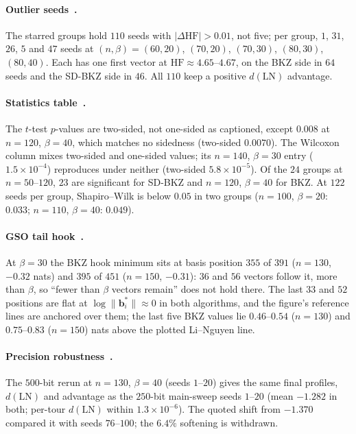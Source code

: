\documentclass[journal=cic,version=preprint]{iacrj}
\begin{document}
\paragraph{Outlier seeds~\cite[\S4.1]{Paper1}.} The starred groups hold $110$ seeds with
$|\Delta\mathrm{HF}|>0.01$, not five; per group, $1$, $31$, $26$, $5$ and
$47$ seeds at $(n,\beta)=(60,20)$, $(70,20)$, $(70,30)$, $(80,30)$, $(80,40)$. Each has one
first vector at $\mathrm{HF}\approx4.65$--$4.67$, on the BKZ side in $64$
seeds and the SD-BKZ side in $46$. All $110$ keep a positive
$d(\mathrm{LN})$ advantage.

\paragraph{Statistics table~\cite[\S4]{Paper1}.} The $t$-test $p$-values are two-sided,
not one-sided as captioned, except $0.008$ at $n=120$, $\beta=40$, which
matches no sidedness (two-sided $0.0070$). The Wilcoxon column mixes two-sided and
one-sided values; its $n=140$, $\beta=30$ entry ($1.5\times10^{-4}$)
reproduces under neither (two-sided $5.8\times10^{-5}$). Of the $24$ groups
at $n=50$--$120$, $23$ are significant for SD-BKZ and $n=120$, $\beta=40$
for BKZ. At $122$ seeds per group, Shapiro--Wilk is below $0.05$ in two groups ($n=100$, $\beta=20$:
$0.033$; $n=110$, $\beta=40$: $0.049$).

\paragraph{GSO tail hook~\cite[\S5.4, \S8.4]{Paper1}.} At $\beta=30$ the BKZ hook
minimum sits at basis position $355$ of $391$ ($n=130$, $-0.32$ nats) and
$395$ of $451$ ($n=150$, $-0.31$): $36$ and $56$ vectors follow it, more
than $\beta$, so ``fewer than $\beta$ vectors remain'' does not hold there.
The last $33$ and $52$ positions are flat at $\log\|\mathbf b_i^\ast\|\approx0$ in
both algorithms, and the figure's reference lines are anchored over them;
the last five BKZ values lie $0.46$--$0.54$ ($n=130$) and $0.75$--$0.83$
($n=150$) nats above the plotted Li--Nguyen line.

\paragraph{Precision robustness~\cite[\S7.4]{Paper1}.} The $500$-bit rerun at $n=130$,
$\beta=40$ (seeds $1$--$20$) gives the same final profiles, $d(\mathrm{LN})$ and advantage as the $250$-bit main-sweep seeds $1$--$20$ (mean $-1.282$ in both; per-tour $d(\mathrm{LN})$ within $1.3\times10^{-6}$). The quoted shift from $-1.370$
compared it with seeds $76$--$100$; the $6.4\%$ softening is withdrawn.
\end{document}
